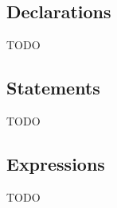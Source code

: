 \documentclass[10pt]{article}
\begin{document}
\subsection{Declarations}
\label{sec:code-gen:declarations}

TODO

\subsection{Statements}
\label{sec:code-gen:statements}

TODO

\subsection{Expressions}
\label{sec:code-gen:expressions}

TODO


\begin{comment}
If no backslash character appears after the second double-quote, then
the string is null-terminated:  in addition to storing the characters
appearing in the double-quotes, it stores a terminating NUL character
(value \$00).  If a backslash character appears after the second
double-quote, then the string is unterminated:  only the characters
appearing between the double-quotes are stored.
\end{comment}
\end{document}
